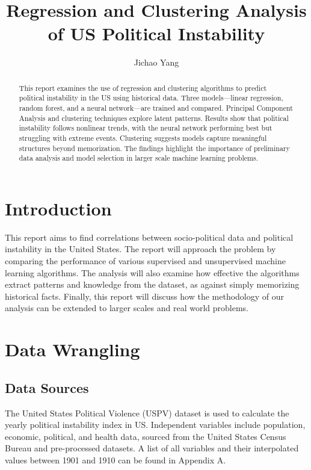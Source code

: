 \documentclass[twocolumn]{article}
\begin{document}
\title{Regression and Clustering Analysis of US Political Instability}
\author{Jichao Yang}
\maketitle

\begin{abstract}
    This report examines the use of regression and clustering algorithms to predict political instability in the US using historical data. Three models—linear regression, random forest, and a neural network—are trained and compared. Principal Component Analysis and clustering techniques explore latent patterns. Results show that political instability follows nonlinear trends, with the neural network performing best but struggling with extreme events. Clustering suggests models capture meaningful structures beyond memorization. The findings highlight the importance of preliminary data analysis and model selection in larger scale machine learning problems.
\end{abstract}

\section*{Introduction}
This report aims to find correlations between socio-political data and political instability in the United States. The report will approach the problem by comparing the performance of various supervised and unsupervised machine learning algorithms. The analysis will also examine how effective the algorithms extract patterns and knowledge from the dataset, as against simply memorizing historical facts. Finally, this report will discuss how the methodology of our analysis can be extended to larger scales and real world problems.

\section{Data Wrangling}
\subsection{Data Sources}
The United States Political Violence (USPV) dataset is used to calculate the yearly political instability index in US. Independent variables include population, economic, political, and health data, sourced from the United States Census Bureau and pre-processed datasets. A list of all variables and their interpolated values between 1901 and 1910 can be found in Appendix A.
\end{document}
